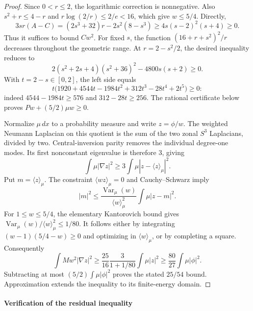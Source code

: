 \documentclass[reqno,11pt]{amsart}
\numberwithin{equation}{section}
\theoremstyle{remark}
\begin{document}
\begin{proof}
Since $0<r\le2$, the logarithmic correction is nonnegative.
Also $s^2+r\le4-r$ and $r\log(2/r)\le2/e<16$, which give $w\le5/4$.
Directly,
\[
 3sr(A-C)=(2s^3+32)r-2s^2(8-s^3)
 \ge4s(s-2)^2(s+4)\ge0.
\]
Thus it suffices to bound $Cw^2$. For fixed $s$, the function
$(16+r+s^2)^2/r$ decreases throughout the geometric range.
At $r=2-s^2/2$, the desired inequality reduces to
\[
 2(s^2+2s+4)(s^2+36)^2-4800s(s+2)\ge0.
\]
With $t=2-s\in[0,2]$, the left side equals
\[
 t\big(1920+4544t-1984t^2+312t^3-28t^4+2t^5\big)\ge0:
\]
indeed $4544-1984t\ge576$ and $312-28t\ge256$.
The rational certificate below proves $Pw+(5/2)\mu w\ge0$.

Normalize $\mu\,dx$ to a probability measure and write $z=\phi/w$.
The weighted Neumann Laplacian on this quotient is the sum of the two
zonal $S^3$ Laplacians, divided by two. Central-inversion parity removes
the individual degree-one modes. Its first nonconstant eigenvalue is
therefore $3$, giving
\[
 \int\mu|\nabla z|^2\ge3\int\mu|z-\langle z\rangle_\mu|^2.
\]
Put $m=\langle z\rangle_\mu$. The constraint $\langle wz\rangle_\mu=0$
and Cauchy--Schwarz imply
\[
 |m|^2\le\frac{\operatorname{Var}_\mu(w)}{\langle w\rangle_\mu^2}
 \int\mu|z-m|^2.
\]
For $1\le w\le5/4$, the elementary Kantorovich bound gives
$\operatorname{Var}_\mu(w)/\langle w\rangle_\mu^2\le1/80$.
It follows either by integrating $(w-1)(5/4-w)\ge0$ and optimizing
in $\langle w\rangle_\mu$, or by completing a square. Consequently
\[
 \int Mw^2|\nabla z|^2
 \ge\frac{25}{16}\frac{3}{1+1/80}\int\mu|z|^2
 \ge\frac{80}{27}\int\mu|\phi|^2.
\]
Subtracting at most $(5/2)\int\mu|\phi|^2$ proves the stated
$25/54$ bound. Approximation extends the inequality to its finite-energy
domain.
\end{proof}

\paragraph{Verification of the residual inequality}
\end{document}
